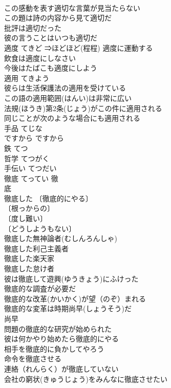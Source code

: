 \documentclass[8pt]{extreport}
\begin{document}
\begin{CJK}{UTF8}{min}
\\	この感動を表す適切な言葉が見当たらない 
\\	この題は詩の内容から見て適切だ 
\\	批評は適切だった 
\\	彼の言うことはいつも適切だ 
\\	適度	てきど	⇒ほどほど(程程) 適度に運動する 
\\	飲食は適度にしなさい 
\\	今後はたばこも適度にしよう 
\\	適用	てきよう	
\\	彼らは生活保護法の適用を受けている 
\\	この語の適用範囲(はんい)は非常に広い 
\\	法規(ほうき)第2条(じょう)がこの件に適用される 
\\	同じことが次のような場合にも適用される 
\\	手品	てじな	
\\	ですから	ですから	
\\	鉄	てつ	
\\	哲学	てつがく	
\\	手伝い	てつだい	
\\	徹底	てってい	徹　
\\	底 
\\	徹底した 〔徹底的にやる〕
\\	〔根っからの〕
\\	〔度し難い〕
\\	〔どうしようもない〕
\\	徹底した無神論者(むしんろんしゃ) 
\\	徹底した利己主義者 
\\	徹底した楽天家 
\\	徹底した怠け者 
\\	彼は徹底して遊興(ゆうきょう)にふけった 
\\	徹底的な調査が必要だ 
\\	徹底的な改革(かいかく)が望（のぞ）まれる 
\\	徹底的な変革は時期尚早(しょうそう)だ 
\\	尚早　
\\	問題の徹底的な研究が始められた 
\\	彼は何かやり始めたら徹底的にやる 
\\	相手を徹底的に負かしてやろう 
\\	命令を徹底させる 
\\	連絡（れんらく）が徹底していない 
\\	会社の窮状(きゅうじょう)をみんなに徹底させたい 

\end{CJK}
\end{document}
